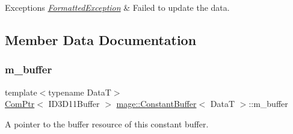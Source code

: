\begin{DoxyExceptions}{Exceptions}
{\em \hyperlink{structmage_1_1_formatted_exception}{Formatted\+Exception}} & Failed to update the data. \\
\hline
\end{DoxyExceptions}


\subsection{Member Data Documentation}
\hypertarget{structmage_1_1_constant_buffer_a394571e3102fe053f3357e2e218c0eda}{}\label{structmage_1_1_constant_buffer_a394571e3102fe053f3357e2e218c0eda} 
\subsubsection{\texorpdfstring{m\+\_\+buffer}{m\_buffer}}
{\footnotesize\ttfamily template$<$typename DataT$>$ \\
\hyperlink{namespacemage_ae74f374780900893caa5555d1031fd79}{Com\+Ptr}$<$ I\+D3\+D11\+Buffer $>$ \hyperlink{structmage_1_1_constant_buffer}{mage\+::\+Constant\+Buffer}$<$ DataT $>$\+::m\+\_\+buffer\hspace{0.3cm}{\ttfamily [private]}}

A pointer to the buffer resource of this constant buffer. 